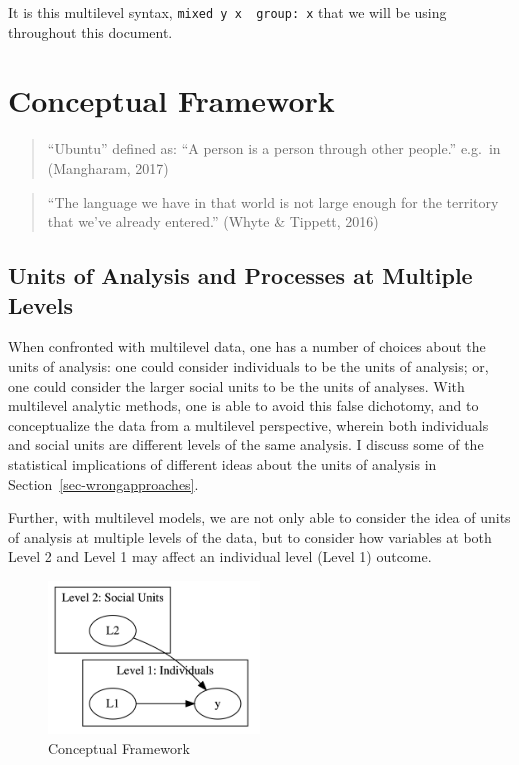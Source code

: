 \documentclass[
  letterpaper,
  DIV=11,
  numbers=noendperiod]{scrreprt}
\begin{document}
It is this multilevel syntax,
\texttt{mixed\ y\ x\ \textbar{}\textbar{}\ group:\ x} that we will be
using throughout this document.


\hypertarget{sec-conceptualframework}{%
\chapter{Conceptual Framework}\label{sec-conceptualframework}}

\begin{quote}
``Ubuntu'' defined as: ``A person is a person through other people.''
e.g.~in (Mangharam, 2017)
\end{quote}

\begin{quote}
``The language we have in that world is not large enough for the
territory that we've already entered.'' (Whyte \& Tippett, 2016)
\end{quote}

\hypertarget{units-of-analysis-and-processes-at-multiple-levels}{%
\section{Units of Analysis and Processes at Multiple
Levels}\label{units-of-analysis-and-processes-at-multiple-levels}}

When confronted with multilevel data, one has a number of choices about
the units of analysis: one could consider individuals to be the units of
analysis; or, one could consider the larger social units to be the units
of analyses. With multilevel analytic methods, one is able to avoid this
false dichotomy, and to conceptualize the data from a multilevel
perspective, wherein both individuals and social units are different
levels of the same analysis. I discuss some of the statistical
implications of different ideas about the units of analysis in
Section~\ref{sec-wrongapproaches}.

Further, with multilevel models, we are not only able to consider the
idea of units of analysis at multiple levels of the data, but to
consider how variables at both Level 2 and Level 1 may affect an
individual level (Level 1) outcome.

\begin{figure}

{\centering \includegraphics[width=0.5\textwidth,height=\textheight]{fig-conceptual.png}

}

\caption{\label{fig-conceptual}Conceptual Framework}

\end{figure}
\end{document}
